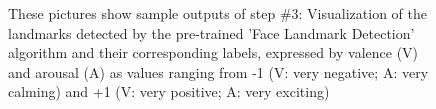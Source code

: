 \begin{figure}[H]
  \hfill
  \caption[ER pipeline step \#3: Landmark detection]{These pictures show sample outputs of step \#3: Visualization of the landmarks detected by the pre-trained 'Face Landmark Detection' algorithm \citep{Kazemi:2014:ShapePredictor} and their corresponding labels, expressed by valence (V) and arousal (A) as values ranging from -1 (V: very negative; A: very calming) and +1 (V: very positive; A: very exciting)}
  \label{fig:MethodologyLandmarks}
\end{figure}

